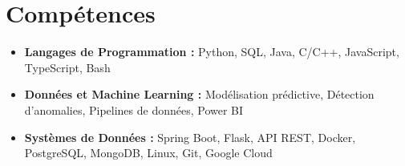 \section{Compétences}

\begin{itemize}[leftmargin=0pt, label={}, itemsep=2pt, topsep=1pt]
  \item \textbf{Langages de Programmation :} Python, SQL, Java, C/C++, JavaScript, TypeScript, Bash
  \item \textbf{Données et Machine Learning :} Modélisation prédictive, Détection d'anomalies, Pipelines de données, Power BI
  \item \textbf{Systèmes de Données :} Spring Boot, Flask, API REST, Docker, PostgreSQL, MongoDB, Linux, Git, Google Cloud
\end{itemize}